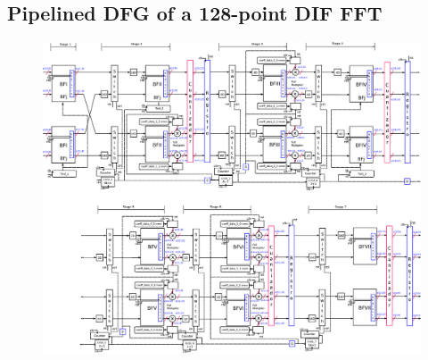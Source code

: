 \documentclass[journal,comsoc]{IEEEtran}
\begin{document}
\subsection{Pipelined DFG of a 128-point DIF FFT\label{sec:appen:pipe_dfg_128}}




\begin{figure}[htbp]%
\centering
\includegraphics[width=\linewidth]{Diagramas/V5_esquema_p.eps} \\ %
\end{figure}


\newpage


\end{document}
